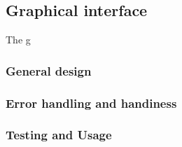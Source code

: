 \subsection{Graphical interface} %
\label{sub:graphical_interface}

The g


\subsubsection{General design} %
\label{ssub:general_design}


\subsubsection{Error handling and handiness} %
\label{ssub:handling_of_the_gui}



\subsubsection{Testing and Usage} %
\label{ssub:testing_and_usage}








